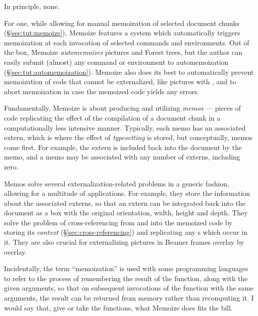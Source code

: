 \documentclass[a4paper,11pt]{article}
\begin{document}
\begin{tcolorbox}[
    title={\introboxtitle{How} much extra work does Memoize require?},
  ]
  In principle, none.

  For one, while allowing for manual memoization of selected document chunks
  (\S\ref{sec:tut:memoize}), Memoize features a system which automatically
  triggers memoization at each invocation of selected commands and
  environments.  Out of the box, Memoize \emph{automemoizes} \TikZ
  pictures and Forest
  trees, but the author can easily submit (almost) any
  command or environment to automemoization (\S\ref{sec:tut:automemoization}).
  Memoize also does its best to automatically prevent memoization of code that
  cannot be externalized, like \TikZ pictures with , and to abort memoization in case the memoized code yields any
  errors.
\end{tcolorbox}


\begin{tcolorbox}[
    title={\introboxtitle{Why} is Memoize not called Externalize?},
  ]
  Fundamentally, Memoize is about producing and utilizing \emph{memos} ---
  pieces of  code replicating the effect of the compilation of a
  document chunk in a computationally less intensive manner.  Typically, each
  memo has an associated extern, which is where the effect of
  \emph{typesetting} is stored, but conceptually, memos come first.  For
  example, the extern is included back into the document by the memo, and a
  memo may be associated with any number of externs, including zero.

  Memos solve several externalization-related problems in a generic fashion,
  allowing for a multitude of applications.  For example, they store the
  information about the associated externs, so that an extern can be integrated
  back into the document as a box with the original orientation, width, height
  and depth.  They solve the problem of cross-referencing from and into the
  memoized code by storing its \emph{context} (\S\ref{sec:cross-referencing})
  and replicating any s which occur in it.  They are also crucial for
  externalizing pictures in Beamer frames overlay by overlay.
  
  Incidentally, the term ``memoization'' is used with some programming
  languages to refer to the process of remembering the result of the function,
  along with the given arguments, so that on subsequent invocations of the
  function with the same arguments, the result can be returned from memory
  rather than recomputing it.  I would say that, give or take the functions,
  what Memoize does fits the bill.
\end{tcolorbox}
\end{document}
